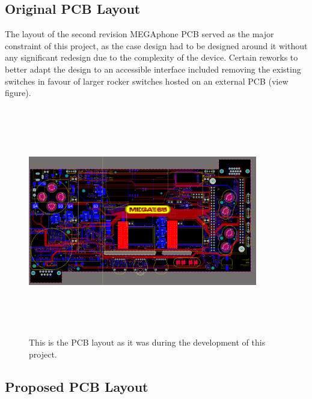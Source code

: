 \subsection{Original PCB Layout}
The layout of the second revision MEGAphone PCB served as the major constraint of this project, as the case design had to be designed around it without any significant redesign due to the complexity of the device. 
Certain reworks to better adapt the design to an accessible interface included removing the existing switches in favour of larger rocker switches hosted on an external PCB (view figure).

\begin{figure} [h]
\begin{centering}
\includegraphics[width=10cm,height=10cm,keepaspectratio]{Figures/pcb_original.png}
\caption{This is the PCB layout as it was during the development of this project.}
\label{fig:ThisFig}
\end{centering}
\end{figure}

\subsection{Proposed PCB Layout}

